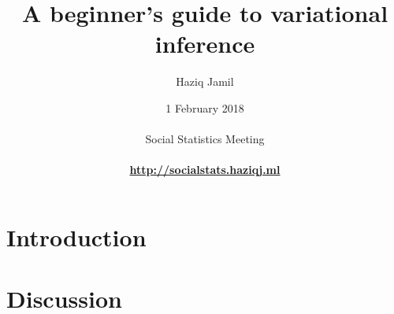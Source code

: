 \documentclass[]{beamer}
\begin{document}

\title[Variational inference]{A beginner's guide to variational inference}
\author[Haziq Jamil]{
  \large{Haziq Jamil}\\ 
}
\date[1 Feb 2018]{
  1 February 2018\\
  \hspace{1cm}\\
  Social Statistics Meeting\\
  \hspace{1cm}\\
  \href{http://socialstats.haziqj.ml}{\color{fu-red!60} \textbf{http://socialstats.haziqj.ml}}
}

\mytitle


\mytoc


\section{Introduction}


%

\section{Discussion}
\transition



%
%
\end{document}
